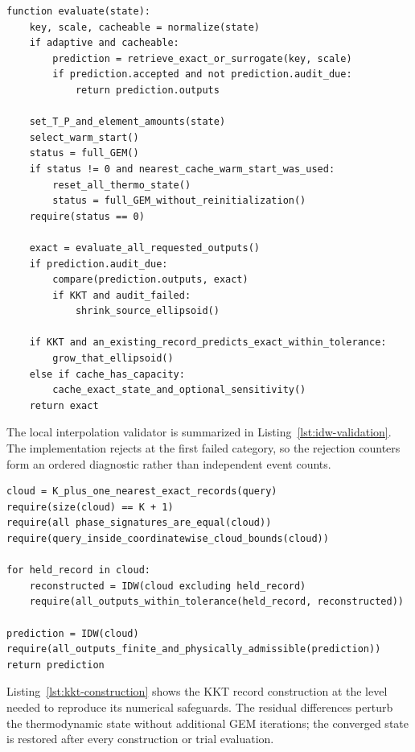 \documentclass[11pt]{article}
\begin{document}
\begin{lstlisting}[caption={Safeguarded evaluation of one thermochemical state.},
label={lst:state-evaluation}]
function evaluate(state):
    key, scale, cacheable = normalize(state)
    if adaptive and cacheable:
        prediction = retrieve_exact_or_surrogate(key, scale)
        if prediction.accepted and not prediction.audit_due:
            return prediction.outputs

    set_T_P_and_element_amounts(state)
    select_warm_start()
    status = full_GEM()
    if status != 0 and nearest_cache_warm_start_was_used:
        reset_all_thermo_state()
        status = full_GEM_without_reinitialization()
    require(status == 0)

    exact = evaluate_all_requested_outputs()
    if prediction.audit_due:
        compare(prediction.outputs, exact)
        if KKT and audit_failed:
            shrink_source_ellipsoid()

    if KKT and an_existing_record_predicts_exact_within_tolerance:
        grow_that_ellipsoid()
    else if cache_has_capacity:
        cache_exact_state_and_optional_sensitivity()
    return exact
\end{lstlisting}

The local interpolation validator is summarized in
Listing~\ref{lst:idw-validation}.  The implementation rejects at the first failed category, so
the rejection counters form an ordered diagnostic rather than independent event counts.

\begin{lstlisting}[caption={Local inverse-distance validation and retrieval.},
label={lst:idw-validation}]
cloud = K_plus_one_nearest_exact_records(query)
require(size(cloud) == K + 1)
require(all phase_signatures_are_equal(cloud))
require(query_inside_coordinatewise_cloud_bounds(cloud))

for held_record in cloud:
    reconstructed = IDW(cloud excluding held_record)
    require(all_outputs_within_tolerance(held_record, reconstructed))

prediction = IDW(cloud)
require(all_outputs_finite_and_physically_admissible(prediction))
return prediction
\end{lstlisting}

Listing~\ref{lst:kkt-construction} shows the KKT record construction at the level needed to
reproduce its numerical safeguards.  The residual differences perturb the thermodynamic state
without additional GEM iterations; the converged state is restored after every construction or
trial evaluation.
\end{document}
